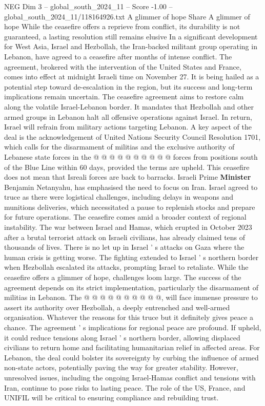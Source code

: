 \begin{textsample}{NEG Dim 3 – global\_south\_2024\_11 – Score -1.00 – global\_south\_2024\_11/118164926.txt}  \label{ex:f3_neg_139}
A glimmer of hope Share A glimmer of hope While the ceasefire offers a reprieve from conflict, its durability is not guaranteed, a lasting resolution still remains elusive In a significant development for West Asia, Israel and Hezbollah, the Iran-backed militant group operating in Lebanon, have agreed to a ceasefire after months of intense conflict.
The agreement, brokered with the intervention of the United States and France, comes into effect at midnight Israeli time on November 27.
It is being hailed as a potential step toward de-escalation in the region, but its success and long-term implications remain uncertain.
The ceasefire agreement aims to restore calm along the volatile Israel-Lebanon border.
It mandates that Hezbollah and other armed groups in Lebanon halt all offensive operations against Israel.
In return, Israel will refrain from military actions targeting Lebanon.
A key aspect of the deal is the acknowledgement of United Nations Security Council Resolution 1701, which calls for the disarmament of militias and the exclusive authority of Lebanese state forces in the @ @ @ @ @ @ @ @ @ @ forces from positions south of the Blue Line within 60 days, provided the terms are upheld.
This ceasefire does not mean that Isreali forces are back to barracks.
Israeli Prime \textbf{Minister} Benjamin Netanyahu, has emphasised the need to focus on Iran.
Israel agreed to truce as there were logistical challenges, including delays in weapons and munitions deliveries, which necessitated a pause to replenish stocks and prepare for future operations.
The ceasefire comes amid a broader context of regional instability.
The war between Israel and Hamas, which erupted in October 2023 after a brutal terrorist attack on Israeli civilians, has already claimed tens of thousands of lives.
There is no let up in Israel ' s attacks on Gaza where the human crisis is getting worse.
The fighting extended to Israel ' s northern border when Hezbollah escalated its attacks, prompting Israel to retaliate.
While the ceasefire offers a glimmer of hope, challenges loom large.
The success of the agreement depends on its strict implementation, particularly the disarmament of militias in Lebanon.
The @ @ @ @ @ @ @ @ @ @, will face immense pressure to assert its authority over Hezbollah, a deeply entrenched and well-armed organisation.
Whatever the reasons for this truce but it definitely gives peace a chance.
The agreement ' s implications for regional peace are profound.
If upheld, it could reduce tensions along Israel ' s northern border, allowing displaced civilians to return home and facilitating humanitarian relief in affected areas.
For Lebanon, the deal could bolster its sovereignty by curbing the influence of armed non-state actors, potentially paving the way for greater stability.
However, unresolved issues, including the ongoing Israel-Hamas conflict and tensions with Iran, continue to pose risks to lasting peace.
The role of the US, France, and UNIFIL will be critical to ensuring compliance and rebuilding trust.

\end{textsample}
